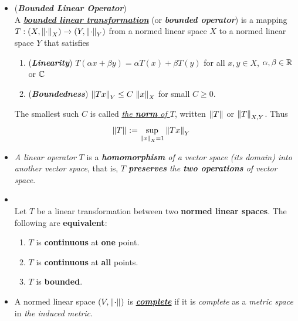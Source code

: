 \documentclass[11pt]{article}
\begin{document}
\begin{itemize}
\item \begin{definition} (\emph{\textbf{Bounded Linear Operator}})\\
A \underline{\emph{\textbf{bounded linear transformation}}} (or \emph{\textbf{bounded operator}}) is a mapping $T: (X, \left\|\cdot\right\|_{X}) \rightarrow (Y, \left\|\cdot\right\|_{Y})$ from a normed linear space $X$ to a normed linear space $Y$ that satisfies 
\begin{enumerate}
\item (\emph{\textbf{Linearity}}) $T(\alpha x + \beta y) = \alpha T(x) + \beta T(y)$ for all $x, y \in X$, $\alpha, \beta \in {\mathbb R}$ or ${\mathbb C}$
\item (\emph{\textbf{Boundedness}}) $\left\|Tx\right\|_{Y} \le C\,\left\|x\right\|_{X}$ for small $C \ge 0$.
\end{enumerate} The smallest such $C$ is called \underline{\emph{the \textbf{norm} of $T$}}, written $\left\|T\right\|_{}$ or $\left\|T\right\|_{X, Y}$. Thus
\begin{align*}
\left\|T\right\|_{} &:= \sup_{\left\|x\right\|_{X} = 1 }\left\|Tx\right\|_{Y}
\end{align*}
\end{definition}

\item \begin{remark}
\emph{A linear operator} $T$ is a \emph{\textbf{homomorphism} of a vector space (its domain) into another vector space}, that is, \emph{$T$ \textbf{preserves} the \textbf{two operations} of vector space}.
\end{remark}

\item \begin{proposition} \citep{reed1980methods, kreyszig1989introductory}\\
Let $T$ be a linear transformation between two \textbf{normed linear spaces}. The following are \textbf{equivalent}:
\begin{enumerate}
\item $T$ is \textbf{continuous} at \textbf{one} point.
\item $T$ is \textbf{continuous} at \textbf{all} points.
\item $T$ is \textbf{bounded}.
\end{enumerate}
\end{proposition}

\item \begin{definition}
A normed linear space $(V, \left\|\cdot\right\|_{})$  is \underline{\emph{\textbf{complete}}} if it is \emph{complete} as a \emph{metric space} in \emph{the induced metric}.
\end{definition}


\end{itemize}
\end{document}
